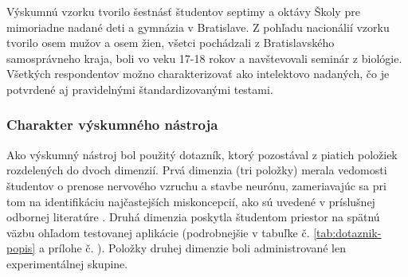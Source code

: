 Výskumnú vzorku tvorilo šestnásť študentov septimy a oktávy Školy pre mimoriadne nadané deti a gymnázia v Bratislave. Z pohľadu nacionálií vzorku tvorilo osem mužov a osem žien, všetci pochádzali z Bratislavského samosprávneho 
kraja, boli vo veku 17-18 rokov a navštevovali seminár z biológie. Všetkých respondentov možno charakterizovať ako intelektovo nadaných, čo je potvrdené aj pravidelnými štandardizovanými testami.

\subsubsection{Charakter výskumného nástroja}
Ako výskumný nástroj bol použitý dotazník, ktorý pozostával z piatich položiek rozdelených do dvoch dimenzií. Prvá dimenzia (tri položky) merala vedomosti študentov o prenose nervového vzruchu a stavbe neurónu, zameriavajúc sa 
pri tom na identifikáciu najčastejších miskoncepcií, ako sú uvedené v príslušnej odbornej literatúre \cite{vijapurkarWhatCellsReally2014, odomActionPotentialsBiology1993, nagyovaMiskoncepcieZiakovOblasti2016}.  
Druhá dimenzia poskytla študentom priestor na spätnú väzbu ohľadom testovanej aplikácie (podrobnejšie v tabuľke č. \ref{tab:dotaznik-popis} a prílohe č. ). Položky druhej dimenzie boli administrované len 
experimentálnej skupine.

